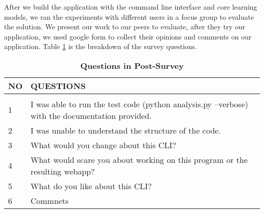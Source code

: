 After we build the application with the command line interface and core learning models, we ran the experiments with different users in a focus group to evaluate the solution. We present our work to our peers to evaluate, after they try our application, we used google form to collect their opinions and comments on our application. Table \ref{post-survey} is the breakdown of the survey questions.
\begin{table}[!htbp]
\caption{\bf Questions in Post-Survey} 
\label{post-survey}
\begin{center}
\begin{tabular}{  l  p{6cm} }
\bf NO & \bf QUESTIONS\\ \hline \\
1 & I was able to run the test code (python analysis.py --verbose) with the documentation provided.\\
2 & I was unable to understand the structure of the code.\\
3 & What would you change about this CLI?\\
4 & What would scare you about working on this program or the resulting webapp?\\
5 & What do you like about this CLI? \\
6 & Commnets
\end{tabular} 
\end{center}
\end{table}

